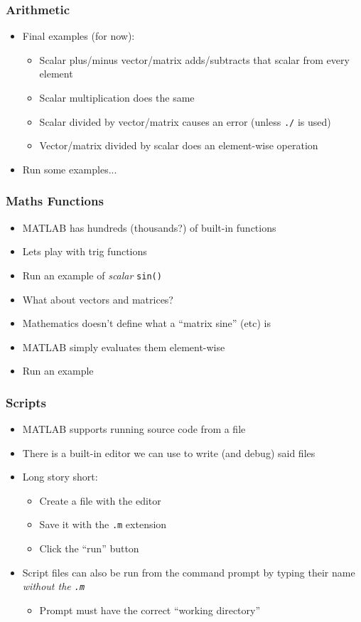 \documentclass[14pt]{beamer}
\begin{document}
\begin{frame}
\frametitle{Arithmetic}
\begin{itemize}
\item Final examples (for now):
	\begin{itemize}
		\item Scalar plus/minus vector/matrix adds/subtracts that scalar from every element
		\item Scalar multiplication does the same
		\item Scalar divided by vector/matrix causes an error (unless \texttt{./} is used)
		\item Vector/matrix divided by scalar does an element-wise operation
	\end{itemize}
\item Run some examples...
\end{itemize}
\end{frame}

\begin{frame}
\frametitle{Maths Functions}
\begin{itemize}
\item MATLAB has hundreds (thousands?) of built-in functions
\item Lets play with trig functions
\item Run an example of \textit{scalar} \texttt{sin()}
\pause
\item What about vectors and matrices?
\pause
\item Mathematics doesn't define what a ``matrix sine'' (etc) is
\item MATLAB simply evaluates them element-wise
\item Run an example
\end{itemize}
\end{frame}

\begin{frame}
\frametitle{Scripts}
\begin{itemize}
\item MATLAB supports running source code from a file
\item There is a built-in editor we can use to write (and debug) said files
\item Long story short:
	\begin{itemize}
		\item Create a file with the editor
		\item Save it with the \texttt{.m} extension
		\item Click the ``run'' button
	\end{itemize}
\item Script files can also be run from the command prompt by typing their name \textit{without the \texttt{.m}}
	\begin{itemize}
		\item Prompt must have the correct ``working directory''
	\end{itemize}
\end{itemize}
\end{frame}
\end{document}
